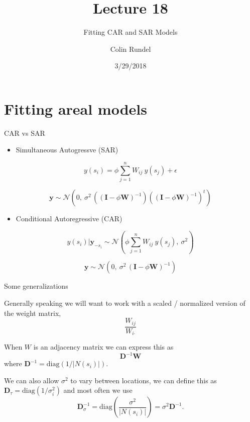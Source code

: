 \documentclass[11pt,ignorenonframetext,]{beamer}
\title{Lecture 18}
\subtitle{Fitting CAR and SAR Models}
\author{Colin Rundel}
\date{3/29/2018}
\providecommand{\tightlist}{%
  \setlength{\itemsep}{0pt}\setlength{\parskip}{0pt}}
\begin{document}
\frame{\titlepage}

\hypertarget{fitting-areal-models}{%
\section{Fitting areal models}\label{fitting-areal-models}}

\begin{frame}{CAR vs SAR}
\protect\hypertarget{car-vs-sar}{}

\begin{itemize}
\tightlist
\item
  Simultaneous Autogressve (SAR)
\end{itemize}

\[ y(s_i) = \phi \sum_{j=1}^n W_{ij} ~ y(s_j) + \epsilon \]

\[ \symbf{y} \sim \mathcal{N}(0,~\sigma^2 \, ((\symbf{I}-\phi \symbf{W})^{-1}) ((\symbf{I}-\phi \symbf{W})^{-1})^t )\]

\begin{itemize}
\tightlist
\item
  Conditional Autoregressive (CAR)
\end{itemize}

\[ y(s_i)|\symbf{y}_{-s_i} \sim \mathcal{N}\left(\phi\sum_{j=1}^n {W}_{ij} ~ y(s_j),~ \sigma^2 \right) \]

\[ \symbf{y} \sim \mathcal{N}(0,~\sigma^2 \, (\symbf{I}-\phi \symbf{W})^{-1})\]

\end{frame}

\begin{frame}[t]{Some generalizations}
\protect\hypertarget{some-generalizations}{}

Generally speaking we will want to work with a scaled / normalized
version of the weight matrix,
\[ \frac{W_{ij}}{W_{i\boldsymbol{\cdot}}}  \]

When \(W\) is an adjacency matrix we can express this as
\[ \symbf{D}^{-1} \symbf{W} \] where
\(\symbf{D}^{-1} = \text{diag}(1/|N(s_i)|)\).

We can also allow \(\sigma^2\) to vary between locations, we can define
this as \(\symbf{D}_\tau = \text{diag}(1/\sigma^2_i)\) and most often we
use
\[ \symbf{D}_\sigma^{-1} = \text{diag}\left(\frac{\sigma^2}{|N(s_i)|}\right) =  \sigma^2 \symbf{D}^{-1}.  \]

\end{frame}
\end{document}
